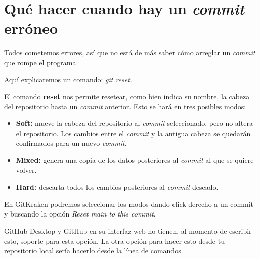 \section{Qué hacer cuando hay un \textit{commit} erróneo}

Todos cometemos errores, así que no está de más saber cómo arreglar un \textit{commit} que rompe el programa.

Aquí explicaremos un comando: \textit{git reset}.

El comando \textbf{reset} nos permite resetear, como bien indica su nombre, la cabeza del repositorio hasta un \textit{commit} anterior.
Esto se hará en tres posibles modos:
\begin{itemize}
    \item\textbf{Soft:} mueve la cabeza del repositorio al \textit{commit} seleccionado, pero no altera el repositorio. Los cambios entre el \textit{commit} y la antigua cabeza se quedarán confirmados para un nuevo \textit{commit}.
    \item\textbf{Mixed:} genera una copia de los datos posteriores al \textit{commit} al que se quiere volver.
    \item\textbf{Hard:} descarta todos los cambios posteriores al \textit{commit} deseado.
\end{itemize}

En GitKraken podremos seleccionar los modos dando click derecho a un commit y buscando la opción \textit{Reset main to this commit}.

GitHub Desktop y GitHub en su interfaz web no tienen, al momento de escribir esto, soporte para esta opción. La otra opción para hacer esto desde tu repositorio local sería hacerlo desde la línea de comandos.

